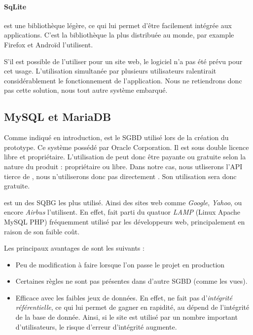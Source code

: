 \paragraph*{SqLite} est une bibliothèque légère, ce qui lui permet d'être facilement intégrée aux applications. C'est la bibliothèque la plus distribuée au monde, par example Firefox et Androïd l'utilisent. 


S'il est possible de l'utiliser pour un site web, le logiciel n'a pas été prévu pour cet usage. L'utilisation simultanée par plusieurs utilisateurs ralentirait considérablement le fonctionnement de l'application. Nous ne retiendrons donc pas cette solution, nous tout autre système embarqué. 

\subsection{MySQL et MariaDB}
 
 Comme indiqué en introduction, \mysql est le SGBD utilisé lors de la création du prototype. Ce système possédé par Oracle Corporation. Il est sous double licence libre et propriétaire. L'utilisation de \mysql peut donc être payante ou gratuite selon la nature du produit : propriétaire ou libre. Dans notre cas, nous utliserons l'API tierce de \symfony, nous n'utiliserons donc pas directement \mysql. Son utilisation sera donc gratuite. 
 
 \mysql est un des SQBG les plus utilisé. Ainsi des sites web comme \textit{Google}, \textit{Yahoo}, ou encore \textit{Airbus}	l'utilisent. En effet, \mysql fait parti du quatuor \textit{LAMP} (Linux Apache MySQL PHP) fréquemment utilisé par les développeurs web, principalement en raison de son faible coût. 
 
 \smallbreak
 
 Les principaux avantages de \mysql sont les suivants : 
 \begin{itemize}
 \item Peu de modification à faire lorsque l'on passe le projet en production 
 \item Certaines règles ne sont pas présentes dans d'autre SGBD (comme les vues). 
 \item Efficace avec les faibles jeux de données. En effet, \mysql ne fait pas d'\textit{intégrité référentielle}, ce qui lui permet de gagner en rapidité, au dépend de l'intégrité de la base de donnée. Ainsi, si le site est utilisé par un nombre important d'utilisateurs, le risque d'erreur d'intégrité augmente. 
 \end{itemize}

